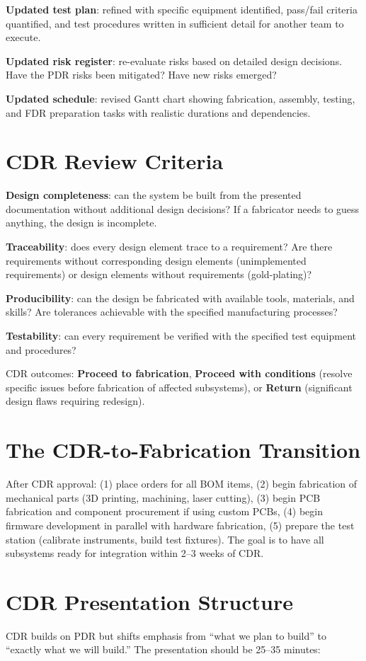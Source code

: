 \documentclass[11pt,letterpaper,twoside,openany]{book}
\begin{document}
\textbf{Updated test plan}: refined with specific equipment identified, pass/fail criteria quantified, and test procedures written in sufficient detail for another team to execute.

\textbf{Updated risk register}: re-evaluate risks based on detailed design decisions. Have the PDR risks been mitigated? Have new risks emerged?

\textbf{Updated schedule}: revised Gantt chart showing fabrication, assembly, testing, and FDR preparation tasks with realistic durations and dependencies.

\section{CDR Review Criteria}
\textbf{Design completeness}: can the system be built from the presented documentation without additional design decisions? If a fabricator needs to guess anything, the design is incomplete.

\textbf{Traceability}: does every design element trace to a requirement? Are there requirements without corresponding design elements (unimplemented requirements) or design elements without requirements (gold-plating)?

\textbf{Producibility}: can the design be fabricated with available tools, materials, and skills? Are tolerances achievable with the specified manufacturing processes?

\textbf{Testability}: can every requirement be verified with the specified test equipment and procedures?

CDR outcomes: \textbf{Proceed to fabrication}, \textbf{Proceed with conditions} (resolve specific issues before fabrication of affected subsystems), or \textbf{Return} (significant design flaws requiring redesign).

\section{The CDR-to-Fabrication Transition}
After CDR approval: (1) place orders for all BOM items, (2) begin fabrication of mechanical parts (3D printing, machining, laser cutting), (3) begin PCB fabrication and component procurement if using custom PCBs, (4) begin firmware development in parallel with hardware fabrication, (5) prepare the test station (calibrate instruments, build test fixtures). The goal is to have all subsystems ready for integration within 2--3 weeks of CDR.
\section{CDR Presentation Structure}
CDR builds on PDR but shifts emphasis from ``what we plan to build'' to ``exactly what we will build.'' The presentation should be 25--35 minutes:
\end{document}
